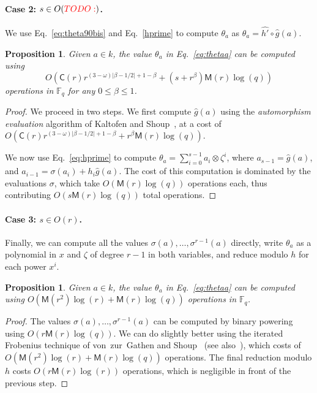 \documentclass[12pt]{article}
\theoremstyle{plain}
\newtheorem{proposition}[theorem]{Proposition}
\theoremstyle{definition}
\newcommand{\todo}[1]{\textcolor{red}{TODO: #1}}
\def\F{\ensuremath{\mathbb{F}}}
\def\MM{\ensuremath{\mathsf{M}}}
\def\CC{\ensuremath{\mathsf{C}}}
\newcounter{algorithm}
\begin{document}
\paragraph{Case 2: $s\in O(\todo{})$.}
We use Eq.~\eqref{eq:theta90bis} and Eq.~\eqref{hprime}
to compute $\theta_a$ as
$\theta_a = \hat{h'}\circ \hat{g} (a)$.
\begin{proposition}
  \label{prop:ks-theta}
  Given $a\in k$, the value $\theta_a$ in Eq.~\eqref{eq:thetaa} can
  be computed using
  \[
  O(\CC(r)r^{(3-\omega)\lvert\beta-1/2\rvert+1-\beta}+(s+r^\beta)\MM(r)\log(q))
  \]
  operations in $\F_q$ for any $0\le\beta\le1$.
\end{proposition}
\begin{proof}
  We proceed in two steps. We first compute $\hat{g}(a)$ using the
  \emph{automorphism evaluation} algorithm of Kaltofen and
  Shoup~\cite[Algorithm~AE]{kaltofen+shoup98}, at a cost of
  $O(\CC(r)r^{(3-\omega)\lvert\beta-1/2\rvert+1-\beta}+r^\beta\MM(r)\log(q))$.
  
  We now use Eq.~\eqref{eq:hprime} to compute
  $\theta_a=\sum_{i=0}^{s-1}a_i\otimes\zeta^i$, where
  $a_{s-1}=\hat{g}(a)$, and $a_{i-1}=\sigma(a_i)+h_i\hat{g}(a)$. %
  The cost of this computation is dominated by the evaluations
  $\sigma$, which take $O(\MM(r)\log(q))$ operations each, thus
  contributing $O(s\MM(r)\log(q))$ total operations.
\end{proof}


\paragraph{Case 3: $s\in O(r)$.}
Finally, we can compute all the values
$\sigma(a),\dots,\sigma^{r-1}(a)$ directly, write $\theta_a$ as a
polynomial in $x$ and $\zeta$ of degree $r-1$ in both variables, and
reduce modulo $h$ for each power $x^i$.

\begin{proposition}
  \label{prop:iter-frob-theta}
  Given $a\in k$, the value $\theta_a$ in Eq.~\eqref{eq:thetaa} can
  be computed using $O(\MM(r^2)\log(r) + \MM(r)\log(q))$ operations in
  $\F_q$.
\end{proposition}
\begin{proof}
  The values $\sigma(a),\dots,\sigma^{r-1}(a)$ can be computed by
  binary powering using $O(r\MM(r)\log(q))$. %
  We can do slightly better using the iterated Frobenius technique of
  von~zur~Gathen and Shoup~\cite[Algorithm~3.1]{von1992computing} (see
  also~\cite[Ch.~14.7]{vzGG}), which costs of
  $O(\MM(r^2)\log(r) + \MM(r)\log(q))$ operations. %
  The final reduction modulo $h$ costs $O(r\MM(r)\log(r))$ operations,
  which is negligible in front of the previous step.
\end{proof}
\end{document}

